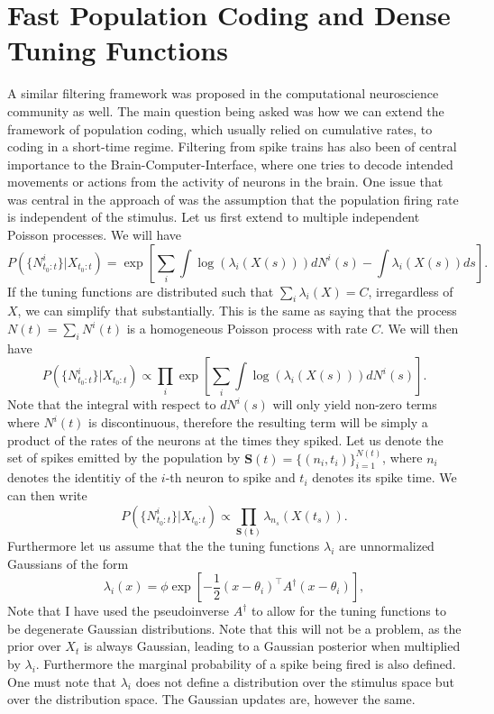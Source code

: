 \section{Fast Population Coding and Dense Tuning Functions}
\label{sec:fast_coding}
A similar filtering framework was proposed in the computational neuroscience community as well.\cite{Huys2007} The main question being asked was how we can extend the framework of population coding, which usually relied on cumulative rates, to coding in a short-time regime. Filtering from spike trains has also been of central importance to the Brain-Computer-Interface, where one tries to decode intended movements or actions from the activity of neurons in the brain.\cite{Ergun2007} One issue that was central in the approach of \citet{Huys2007} was the assumption that the population firing rate is independent of the stimulus. Let us first extend  to multiple independent Poisson processes. We will have
\begin{equation}
\label{eq:dspp_multi_likelihood}
P(\{N^i_{t_0:t}\}|X_{t_0:t}) = \exp\left[\sum_i \int \log(\lambda_i(X(s)))dN^i(s) -\int \lambda_i(X(s))ds\right].
\end{equation}
If the tuning functions are distributed such that $\sum_i\lambda_i(X) = C$, irregardless of $X$, we can simplify that substantially. This is the same as saying that the process $N(t) = \sum_i N^i(t)$ is a homogeneous Poisson process with rate $C$.
We will then have
\begin{equation}
P(\{N^i_{t_0:t}\}|X_{t_0:t}) \propto \prod_i \exp\left[\sum_i \int \log(\lambda_i(X(s))) dN^i(s)\right].
\end{equation}
Note that the integral with respect to $dN^i(s)$ will only yield non-zero terms where $N^i(t)$ is discontinuous, therefore the resulting term will be simply a product of the rates of the neurons at the times they spiked. Let us denote the set of spikes emitted by the population by $\boldsymbol{S}(t) = \{(n_i,t_i)\}_{i=1}^{N(t)}$, where $n_i$ denotes the identitiy of the $i$-th neuron to spike and $t_i$ denotes its spike time. We can then write
\begin{equation}
P(\{N^i_{t_0:t}\}|X_{t_0:t}) \propto \prod_{\boldsymbol{S(t)}} \lambda_{n_s}(X(t_s)).
\end{equation}
Furthermore let us assume that the the tuning functions $\lambda_i$ are unnormalized Gaussians of the form
\[
\lambda_i(x) = \phi \exp\left[-\frac{1}{2} (x-\theta_i)^\top A^\dagger (x-\theta_i)\right],
\]
Note that I have used the pseudoinverse $A^\dagger$ to allow for the tuning functions to be degenerate Gaussian distributions. Note that this will not be a problem, as the prior over $X_t$ is always Gaussian, leading to a Gaussian posterior when multiplied by $\lambda_i$. Furthermore the marginal probability of a spike being fired is also defined. One must note that $\lambda_i$ does not define a distribution over the stimulus space but over the distribution space. The Gaussian updates are, however the same.\par

